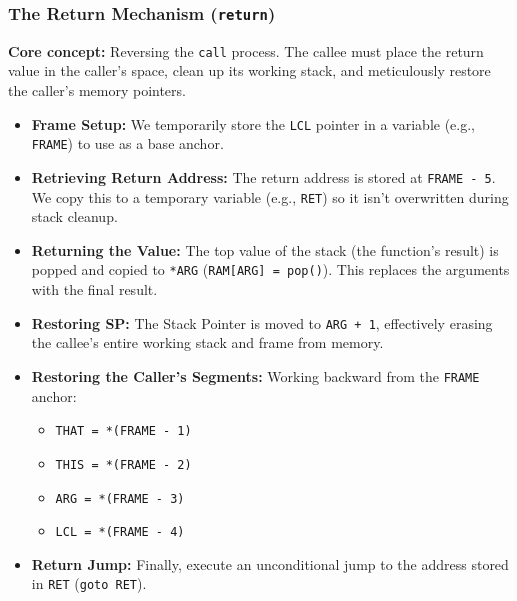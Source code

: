\documentclass[12pt,a4paper]{article}
\begin{document}
\subsubsection*{The Return Mechanism (\texttt{return})}
\textbf{Core concept:} Reversing the \texttt{call} process. The callee must place the return value in the caller's space, clean up its working stack, and meticulously restore the caller's memory pointers.
\begin{itemize}
    \item \textbf{Frame Setup:} We temporarily store the \texttt{LCL} pointer in a variable (e.g., \texttt{FRAME}) to use as a base anchor.
    \item \textbf{Retrieving Return Address:} The return address is stored at \texttt{FRAME - 5}. We copy this to a temporary variable (e.g., \texttt{RET}) so it isn't overwritten during stack cleanup.
    \item \textbf{Returning the Value:} The top value of the stack (the function's result) is popped and copied to \texttt{*ARG} (\texttt{RAM[ARG] = pop()}). This replaces the arguments with the final result.
    \item \textbf{Restoring SP:} The Stack Pointer is moved to \texttt{ARG + 1}, effectively erasing the callee's entire working stack and frame from memory.
    \item \textbf{Restoring the Caller's Segments:} Working backward from the \texttt{FRAME} anchor:
    \begin{itemize}
        \item \texttt{THAT = *(FRAME - 1)}
        \item \texttt{THIS = *(FRAME - 2)}
        \item \texttt{ARG = *(FRAME - 3)}
        \item \texttt{LCL = *(FRAME - 4)}
    \end{itemize}
    \item \textbf{Return Jump:} Finally, execute an unconditional jump to the address stored in \texttt{RET} (\texttt{goto RET}).
\end{itemize}
\end{document}
